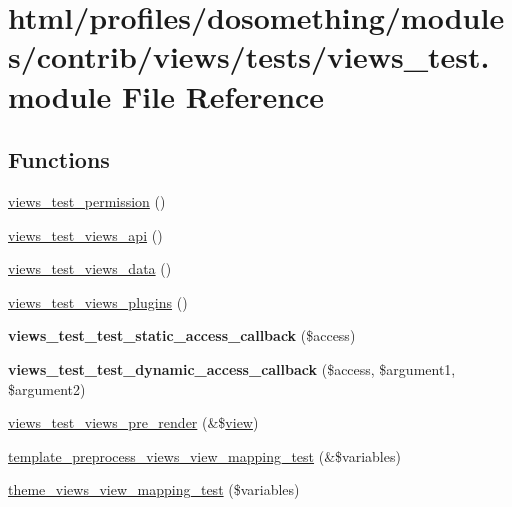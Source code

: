 \hypertarget{views__test_8module}{
\section{html/profiles/dosomething/modules/contrib/views/tests/views\_\-test.module File Reference}
\label{views__test_8module}
}
\subsection*{Functions}
\begin{DoxyCompactItemize}
\item 
\hyperlink{views__test_8module_a5768b933d9689c113d322f2904be336a}{views\_\-test\_\-permission} ()
\item 
\hyperlink{views__test_8module_afc691cec43665bc3c566210bf1a5cdbd}{views\_\-test\_\-views\_\-api} ()
\item 
\hyperlink{views__test_8module_a97293d465c8d574b6be39b11d79f1a13}{views\_\-test\_\-views\_\-data} ()
\item 
\hyperlink{views__test_8module_a1d92c7f29f0341731c7a9d4d5468f888}{views\_\-test\_\-views\_\-plugins} ()
\item 
\hypertarget{views__test_8module_afd6d17b506dd09d59e7dfd0e6effa9f1}{
{\bfseries views\_\-test\_\-test\_\-static\_\-access\_\-callback} (\$access)}
\label{views__test_8module_afd6d17b506dd09d59e7dfd0e6effa9f1}

\item 
\hypertarget{views__test_8module_a1860f9930944b78c476718d43d221c66}{
{\bfseries views\_\-test\_\-test\_\-dynamic\_\-access\_\-callback} (\$access, \$argument1, \$argument2)}
\label{views__test_8module_a1860f9930944b78c476718d43d221c66}

\item 
\hyperlink{views__test_8module_ae5532b352f8358a411334ad3e1bb654f}{views\_\-test\_\-views\_\-pre\_\-render} (\&\$\hyperlink{classview}{view})
\item 
\hyperlink{views__test_8module_ae1d29e3e940b012ae0a23c2903688372}{template\_\-preprocess\_\-views\_\-view\_\-mapping\_\-test} (\&\$variables)
\item 
\hyperlink{views__test_8module_ac1289dbbc1036d5221dfaf5189fb7251}{theme\_\-views\_\-view\_\-mapping\_\-test} (\$variables)
\end{DoxyCompactItemize}


